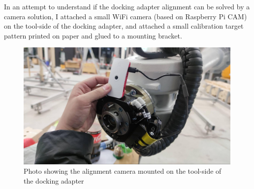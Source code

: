 In an attempt to understand if the docking adapter alignment can be solved by a camera solution, I attached a small WiFi camera (based on Raspberry Pi CAM) on the tool-side of the docking adapter, and attached a small calibration target pattern printed on paper and glued to a mounting bracket.

\begin{figure}[!h]
    \centering
    \includegraphics[width=0.99\textwidth]{images/6b/img09.jpg}
    \caption{Photo showing the alignment camera mounted on the tool-side of the docking adapter}
\end{figure}


